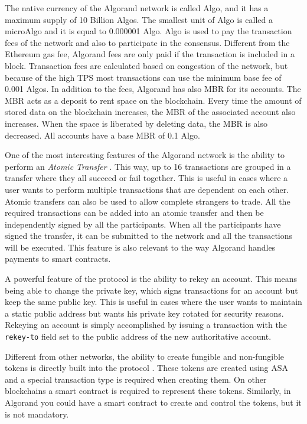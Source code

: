 The native currency of the Algorand network is called Algo, and it has a maximum supply of 10 Billion Algos. The smallest unit of Algo is called a microAlgo and it is equal to 0.000001 Algo.
Algo is used to pay the transaction fees of the network and also to participate in the consensus. Different from the Ethereum gas fee, Algorand fees are only paid if the transaction is included in a block. Transaction fees are calculated based on congestion of the network, but because of the high \ac{TPS} most transactions can use the minimum base fee of 0.001 Algos. In addition to the fees, Algorand has also \ac{MBR} for its accounts. The \ac{MBR} acts as a deposit to rent space on the blockchain. Every time the amount of stored data on the blockchain increases, the \ac{MBR} of the associated account also increases. When the space is liberated by deleting data, the \ac{MBR} is also decreased. All accounts have a base \ac{MBR} of 0.1 Algo.

One of the most interesting features of the Algorand network is the ability to perform an \emph{Atomic Transfer} \cite{noauthor_atomic_nodate}. This way, up to 16 transactions are grouped in a transfer where they all succeed or fail together. This is useful in cases where a user wants to perform multiple transactions that are dependent on each other. Atomic transfers can also be used to allow complete strangers to trade. All the required transactions can be added into an atomic transfer and then be independently signed by all the participants. When all the participants have signed the transfer, it can be submitted to the network and all the transactions will be executed. This feature is also relevant to the way Algorand handles payments to smart contracts.

A powerful feature of the protocol is the ability to rekey an account. This means being able to change the private key, which signs transactions for an account but keep the same public key. This is useful in cases where the user wants to maintain a static public address but wants his private key rotated for security reasons. Rekeying an account is simply accomplished by issuing a transaction with the \texttt{rekey-to} field set to the public address of the new authoritative account.

Different from other networks, the ability to create fungible and non-fungible tokens is directly built into the protocol \cite{noauthor_algorand_nodate-4}. These tokens are created using \ac{ASA} and a special transaction type is required when creating them. On other blockchains a smart contract is required to represent these tokens. Similarly, in Algorand you could have a smart contract to create and control the tokens, but it is not mandatory.

